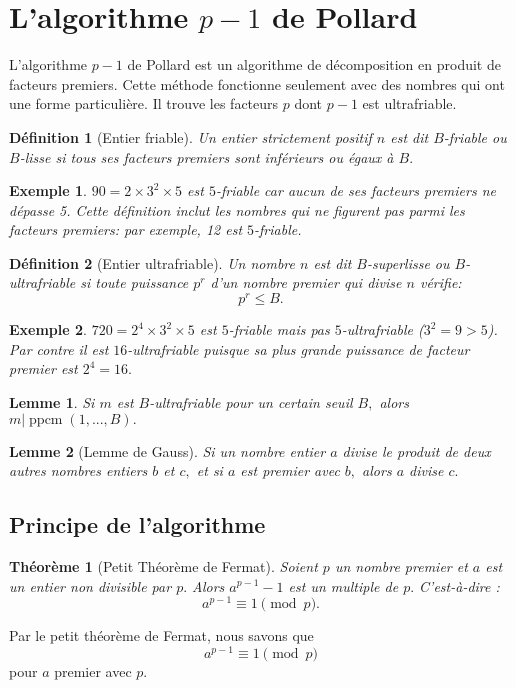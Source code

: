 \documentclass[french, 12pt, titlepage]{article}
\DeclareMathOperator{\ppcm}{ppcm}
\newtheorem{definition}{D{\'e}finition}
\newtheorem{theoreme}{Th{\'e}or{\`e}me}
\newtheorem{lemme}{Lemme}
\newtheorem{example}{Exemple}
\begin{document}
\section{L'algorithme $p-1$ de Pollard}

L'algorithme $p-1$ de Pollard est un algorithme de décomposition en produit de facteurs premiers. Cette méthode fonctionne seulement avec des nombres qui ont une forme particulière. Il trouve les facteurs $p$ dont $p-1$ est ultrafriable.

\begin{definition}[Entier friable]
Un entier strictement positif $n$ est dit $B$-friable ou $B$-lisse si tous ses facteurs premiers sont inférieurs ou égaux à $B.$ 
\end{definition}
\begin{example}
$90 = 2 \times 3^2 \times 5$ est $5$-friable car aucun de ses facteurs premiers ne dépasse 5.
Cette définition inclut les nombres qui ne figurent pas parmi les facteurs premiers: par exemple, 12 est $5$-friable.
\end{example}
\begin{definition}[Entier ultrafriable]
Un nombre $n$ est dit $B$-superlisse ou $B$-ultrafriable si toute puissance $p^r$ d'un nombre premier qui divise $n$ vérifie: \[ p^r \leq B .\]
\end{definition}
\begin{example}
$720 = 2^4 \times 3^2 \times 5$ est $5$-friable mais pas $5$-ultrafriable ($3^2 = 9 > 5$). Par contre il est $16$-ultrafriable puisque sa plus grande puissance de facteur premier est $2^4 = 16.$
\end{example}

\begin{lemme}\label{leme}
Si $m$ est $B$-ultrafriable pour un certain seuil $B,$ alors $m | \ppcm(1,...,B).$
\end{lemme}

\begin{lemme}[Lemme de Gauss]
Si un nombre entier $a$ divise le produit de deux autres nombres entiers $b$ et $c,$ et si $a$ est premier avec $b,$ alors $a$ divise $c.$
\end{lemme}

\subsection{Principe de l'algorithme}

\begin{theoreme}[Petit Théorème de Fermat]
Soient $p$ un nombre premier et $a$ est un entier non divisible par $p.$ Alors $a^{p-1} - 1$ est un multiple de $p.$ C'est-à-dire : \[a^{p-1} \equiv 1 \pmod p .\]
\end{theoreme}
Par le petit théorème de Fermat, nous savons que \[a^{p-1} \equiv 1 \pmod p \] pour $a$ premier avec $p.$ 
\end{document}
